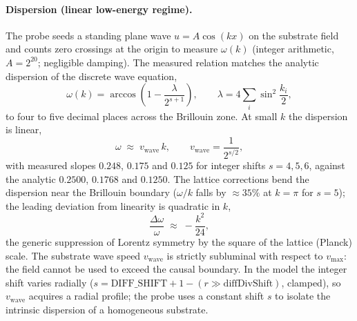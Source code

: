 \documentclass{ijuc}
\begin{document}
\paragraph{Dispersion (linear low-energy regime).}  The probe seeds a standing plane wave $u=A\cos(kx)$ on the substrate field and counts zero crossings at the origin to measure $\omega(k)$ (integer arithmetic, $A=2^{20}$; negligible damping).  The measured relation matches the analytic dispersion of the discrete wave equation,
\begin{equation}
\omega(k) = \arccos\!\left(1-\frac{\lambda}{2^{s+1}}\right), \qquad \lambda = 4\sum_{i}\sin^{2}\!\frac{k_{i}}{2},
\label{eq:dispersion}
\end{equation}
to four to five decimal places across the Brillouin zone.  At small $k$ the dispersion is linear,
\begin{equation}
\omega \;\approx\; v_{\mathrm{wave}}\,k , \qquad v_{\mathrm{wave}} = \frac{1}{2^{s/2}} ,
\label{eq:wave-speed}
\end{equation}
with measured slopes $0.248$, $0.175$ and $0.125$ for integer shifts $s=4,5,6$, against the analytic $0.2500$, $0.1768$ and $0.1250$.  The lattice corrections bend the dispersion near the Brillouin boundary ($\omega/k$ falls by $\approx35\%$ at $k=\pi$ for $s=5$); the leading deviation from linearity is quadratic in $k$,
\begin{equation}
\frac{\Delta\omega}{\omega} \;\approx\; -\frac{k^{2}}{24},
\label{eq:dispersion-correction}
\end{equation}
the generic suppression of Lorentz symmetry by the square of the lattice (Planck) scale.  The substrate wave speed $v_{\mathrm{wave}}$ is strictly subluminal with respect to $v_{\max}$: the field cannot be used to exceed the causal boundary.  In the model the integer shift varies radially ($s=\mathrm{DIFF\_SHIFT}+1-(r\gg\mathrm{diffDivShift})$, clamped), so $v_{\mathrm{wave}}$ acquires a radial profile; the probe uses a constant shift $s$ to isolate the intrinsic dispersion of a homogeneous substrate.
\end{document}
